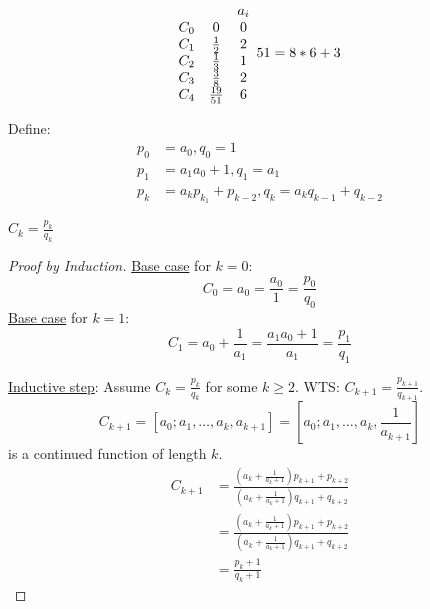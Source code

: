     \[
        \begin{matrix}
            & & a_i \\
            C_0 & 0 & 0 \\ 
            C_1 & \frac{1}{2} & 2 \\
            C_2 & \frac{1}{3} & 1 \\
            C_3 & \frac{3}{8} & 2 \\
            C_4 & \frac{19}{51} & 6
        \end{matrix} \\
        51 = 8*6 + 3
    \]

    Define:
    \begin{align*}
        p_0 &= a_0, q_0 = 1 \\
        p_1 &= a_1 a_0 + 1, q_1 = a_1 \\
        p_k &= a_k p_{k_1} + p_{k-2}, q_k = a_k q_{k-1} + q_{k-2}
    \end{align*}

    \begin{theorem}
        $C_k = \frac{p_k}{q_k}$
        \begin{proof} [Proof by Induction]
            \underline{Base case} for $k = 0$: 
            \[
                C_0 = a_0 = \frac{a_0}{1} = \frac{p_0}{q_0}
            \]
            \underline{Base case} for $k = 1$:
            \[
                C_1 = a_0 + \frac{1}{a_1} = \frac{a_1 a_0 + 1}{a_1} = \frac{p_1}{q_1}
            \]

            \underline{Inductive step}: Assume $C_k = \frac{p_k}{q_k}$ for some $k\ge 2$. 
            WTS: $C_{k+1} = \frac{p_{k+1}}{q_{k+1}}$.
            \[
                C_{k+1} = [a_0;a_1,\dots,a_k,a_{k+1}] = [a_0;a_1,\dots,a_k,\frac{1}{a_{k+1}}]
            \]
            is a continued function of length $k$. 
            \begin{align*}
                C_{k+1} &= \frac{(a_k + \frac{1}{a_k + 1})p_{k+1} + p_{k+2}}{(a_k + \frac{1}{a_k + 1})q_{k+1} + q_{k+2}} \\
                &= \frac{(a_k + \frac{1}{a_k + 1})p_{k+1} + p_{k+2}}{(a_k + \frac{1}{a_k + 1})q_{k+1} + q_{k+2}} \\
                &= \frac{p_k + 1}{q_k + 1}
            \end{align*}
        \end{proof}
    \end{theorem}